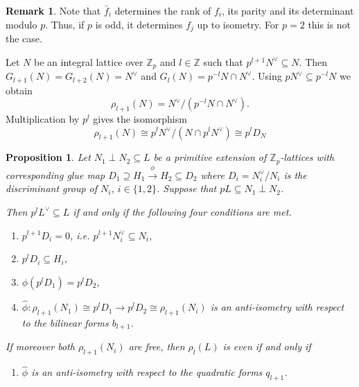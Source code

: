 \documentclass[a4paper]{amsart}
\theoremstyle{definition}
\newtheorem{remark}[definition]{Remark}
\theoremstyle{plain}
\newtheorem{proposition}[definition]{Proposition}
\newcommand{\ZZ}{\mathbb{Z}}
\begin{document}
\begin{remark}
Note that $\bar f_i$ determines the rank of $f_i$, its parity and its determinant modulo $p$. Thus, if $p$ is odd, it determines $f_j$ up to isometry. For $p=2$ this is not the case.
\end{remark}

Let $N$ be an integral lattice over $\ZZ_p$ and $l \in \ZZ$ such that
$p^{l+1} N^\vee \subseteq N$. Then $G_{l+1}(N)=G_{l+2}(N) = N^\vee$ and $G_{l}(N)=p^{-l}N \cap N^\vee$.
Using $pN^\vee \subseteq p^{-l}N$ we obtain
\[\rho_{l+1}(N)
%
= N^\vee /(p^{-l}N \cap N^\vee). \]
Multiplication by $p^l$ gives the isomorphism
\[\rho_{l+1}(N) \cong
p^l N^\vee/ (N \cap p^l N^\vee) \cong
p^lD_N\]

\begin{proposition}\label{glue:estimate-level}
 Let $N_1 \perp N_2 \subseteq L$ be a primitive extension of $\ZZ_p$-lattices with corresponding glue map
 $D_1 \supseteq H_1 \xrightarrow{\phi} H_2 \subseteq D_2$ where $D_i=N_i^\vee/N_i$ is the discriminant group of $N_i$, $i\in \{1,2\}$. Suppose that $p L \subseteq N_1 \perp N_2$.

 Then $p^l L^\vee \subseteq L$ if and only if the following four conditions are met.
 \begin{enumerate}
  \item $p^{l+1} D_i = 0$, i.e. $p^{l+1}N_i^\vee\subseteq N_i$,
  \item $p^l D_i \subseteq H_i$,
  \item $\phi(p^l D_1) = p^l D_2$,
  \item $\hat \phi \colon \rho_{l+1}(N_1)\cong p^lD_1 \to p^lD_2 \cong \rho_{l+1}(N_i)$ is an anti-isometry with respect to the bilinear forms $b_{l+1}$.
 \end{enumerate}
If moreover both $\rho_{l+1}(N_i)$ are free, then $\rho_l(L)$ is even if and only if
 \begin{enumerate}
\item [(4')] $\hat\phi$ is an anti-isometry with respect to the quadratic forms $q_{l+1}$.
 \end{enumerate}
%
\end{proposition}
\end{document}
